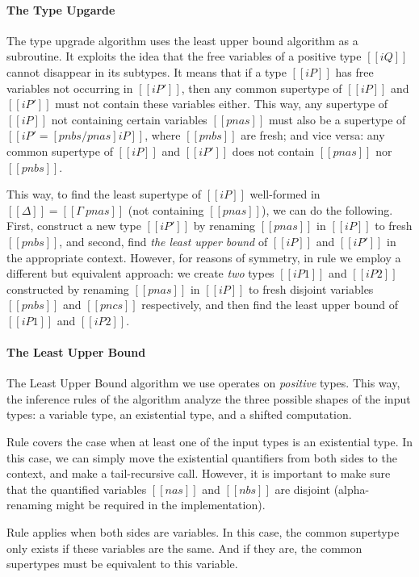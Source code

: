 \paragraph{The Type Upgarde}
The type upgrade algorithm uses the least upper bound algorithm as a subroutine.
It exploits the idea that the free variables of a positive type $[[iQ]]$
cannot disappear in its subtypes. It means that if 
a type $[[iP]]$ has free variables not occurring 
in $[[iP']]$, then any common supertype of $[[iP]]$
and $[[iP']]$ must not contain these variables either.
This way, any supertype of $[[iP]]$
not containing certain variables $[[pnas]]$ must also be 
a supertype of $[[iP' = [pnbs/pnas]iP ]]$, where $[[pnbs]]$ are fresh;
and vice versa: any common supertype of $[[iP]]$ and $[[iP']]$
does not contain $[[pnas]]$ nor $[[pnbs]]$.

This way, to find the least supertype of $[[iP]]$ well-formed in $[[Δ]] = [[Γ \ {pnas}]]$
(\ie not containing $[[pnas]]$), we can do the following.
First, construct a new type $[[iP']]$ by renaming $[[pnas]]$ in $[[iP]]$ to fresh $[[pnbs]]$,
and second, find \emph{the least upper bound} of $[[iP]]$ and $[[iP']]$ in the appropriate
context. However, for reasons of symmetry, in rule
 we employ a different but equivalent approach:
we create \emph{two} types $[[iP1]]$ and $[[iP2]]$ constructed by renaming $[[pnas]]$ in $[[iP]]$
to fresh disjoint variables $[[pnbs]]$ and $[[pncs]]$ respectively, and then 
find the least upper bound of $[[iP1]]$ and $[[iP2]]$.

\paragraph{The Least Upper Bound}
The Least Upper Bound algorithm we use operates on \emph{positive}
types. This way, the inference rules of the algorithm
analyze the three possible shapes of the input types:
a variable type, an existential type, and a shifted computation.

 Rule  covers the case when 
 at least one of the input types is an existential type.
 In this case, we can simply move the existential quantifiers
 from both sides to the context, and make a tail-recursive call.
 However, it is important to make sure that 
 the quantified variables $[[nas]]$ and $[[nbs]]$ are disjoint
 (\ie alpha-renaming might be required in the implementation).
  
 Rule  applies when 
 both sides are variables. In this case,
 the common supertype only exists if these variables are 
 the same. And if they are, the common supertypes
 must be equivalent to this variable.

